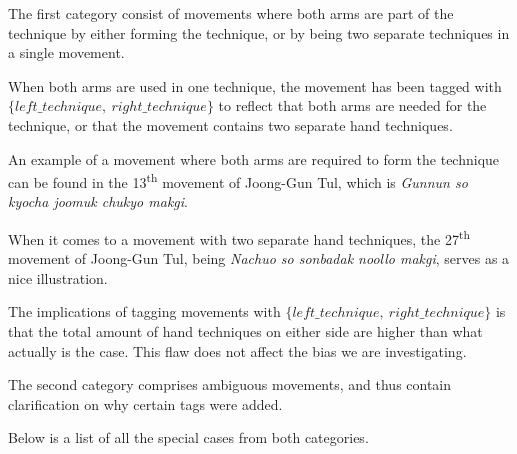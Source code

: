 \documentclass[10pt,twocolumn,a4paper]{article}
\begin{document}
  The first category consist of movements where both arms are part of the
  technique by either forming the technique, or by being two separate
  techniques in a single movement.

  When both arms are used in one technique, the movement has been tagged with
  $\{left\_technique, \: right\_technique\}$ to reflect that both arms are
  needed for the technique, or that the movement contains two separate hand
  techniques.

  An example of a movement where both arms are required to form the technique
  can be found in the 13\textsuperscript{th} movement of Joong-Gun Tul, which
  is \emph{Gunnun so kyocha joomuk chukyo makgi}.

  When it comes to a movement with two separate hand techniques, the
  27\textsuperscript{th} movement of Joong-Gun Tul, being \emph{Nachuo so
  sonbadak noollo makgi}, serves as a nice illustration.

  The implications of tagging movements with $\{left\_technique, \:
  right\_technique\}$ is that the total amount of hand techniques on either
  side are higher than what actually is the case. This flaw does not affect
  the bias we are investigating.

  The second category comprises ambiguous movements, and thus contain
  clarification on why certain tags were added.

  Below is a list of all the special cases from both categories.
\end{document}
